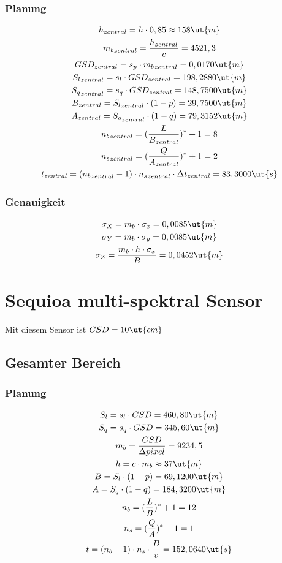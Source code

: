 \subsubsection{Planung}
\begin{gather*}
h_{zentral} = h \cdot 0,85 \approx 158 \ut{m} \\
{m_b}_{zentral}  = \frac{h_{zentral}}{c} = 4521,3 \\
GSD_{zentral} = s_p \cdot {m_b}_{zentral} = 0,0170 \ut{m} \\
{S_l}_{zentral} = s_l \cdot GSD_{zentral} = 198,2880 \ut{m} \\
{S_q}_{zentral} = s_q \cdot GSD_{zentral} = 148,7500 \ut{m} \\
B_{zentral} = {S_l}_{zentral} \cdot (1-p) = 29,7500 \ut{m} \\
A_{zentral} = {S_q}_{zentral} \cdot (1-q) = 79,3152 \ut{m} \\
{n_b}_{zentral} = (\frac{L}{B_{zentral}})^* + 1 = 8 \\
{n_s}_{zentral} = (\frac{Q}{A_{zentral}})^* + 1 = 2 \\	
t_{zentral} = ({n_b}_{zentral} - 1) \cdot {n_s}_{zentral} \cdot \Delta t_{zentral} = 83,3000 \ut{s} \\
\end{gather*}
\subsubsection{Genauigkeit}
\begin{gather*}
\sigma_X = m_b \cdot \sigma_x = 0,0085 \ut{m} \\
\sigma_Y = m_b \cdot \sigma_y = 0,0085 \ut{m} \\
\sigma_Z = \frac{m_b \cdot h \cdot \sigma_x}{B} = 0,0452 \ut{m}
\end{gather*}
\newpage

\section{Sequioa multi-spektral Sensor}
Mit diesem Sensor ist $GSD = 10 \ut{cm}$
\subsection{Gesamter Bereich}
\subsubsection{Planung}
\begin{gather*}
S_l = s_l \cdot GSD = 460,80 \ut{m} \\
S_q = s_q \cdot GSD = 345,60 \ut{m} \\
m_b = \frac{GSD}{\Delta pixel} = 9234,5 \\
h = c \cdot m_b \approx 37 \ut{m}  \\
B = S_l \cdot (1-p) = 69,1200 \ut{m} \\
A = S_q \cdot (1-q) = 184,3200 \ut{m} \\
n_b = (\frac{L}{B})^* + 1 = 12 \\
n_s = (\frac{Q}{A})^* + 1 = 1 \\	
t = (n_b - 1) \cdot n_s \cdot \frac{B}{v} = 152,0640 \ut{s} \\
\end{gather*}
